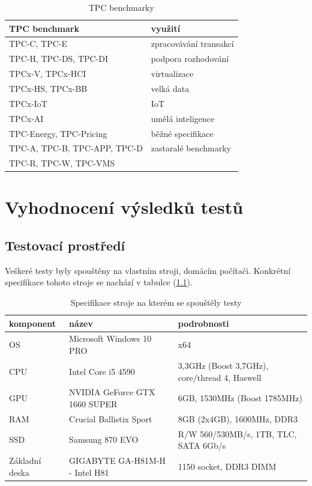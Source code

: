 \documentclass[czech,master,dept460,male,csharp,cpdeclaration]{diploma}
\begin{document}
	\begin{table}
		\centering
		\begin{tabular}{ l | l }
			\toprule
			TPC benchmark & využití\\
			\midrule
			TPC-C, TPC-E & zpracovávání transakcí \\
			TPC-H, TPC-DS, TPC-DI & podpora rozhodování \\
			TPCx-V, TPCx-HCI & virtualizace \\
			TPCx-HS, TPCx-BB & velká data \\
			TPCx-IoT & IoT \\
			TPCx-AI & umělá inteligence \\
			TPC-Energy, TPC-Pricing & běžné specifikace \\
			TPC-A, TPC-B, TPC-APP, TPC-D & zastaralé benchmarky \\
			TPC-R, TPC-W, TPC-VMS & \\
			\bottomrule
		\end{tabular}
		\caption{TPC benchmarky\label{tab_tpc_modely}}
	\end{table}
	
	\chapter{Vyhodnocení výsledků testů}
	
	\section{Testovací prostředí}
	
	Veškeré testy byly spouštěny na vlastním stroji, domácím počítači. Konkrétní specifikace tohoto stroje se nachází v tabulce (\ref{tab_my_pc_spec}). 
	
	\begin{table}
	\centering
	\caption{Specifikace stroje na kterém se spouštěly testy\label{tab_my_pc_spec}}
		\begin{tabular}{ l | l | l } 
			\toprule
			komponent & název & podrobnosti \\
			\midrule
			OS & Microsoft Windows 10 PRO & x64 \\
			CPU & Intel Core i5 4590 & 3,3GHz (Boost 3,7GHz), core/thread 4, Haswell\\
			GPU & NVIDIA GeForce GTX 1660 SUPER & 6GB, 1530MHz (Boost 1785MHz) \\
			RAM & Crucial Ballistix Sport & 8GB (2x4GB), 1600MHz, DDR3 \\
			SSD & Samsung 870 EVO & R/W 560/530MB/s, 1TB, TLC, SATA 6Gb/s \\
			Základní deska & GIGABYTE GA-H81M-H - Intel H81 & 1150 socket, DDR3 DIMM \\
			\bottomrule
		\end{tabular}
	\end{table}
\end{document}
